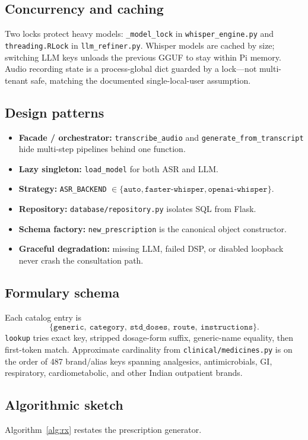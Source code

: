 \documentclass[11pt,a4paper]{article}
\begin{document}
\subsection{Concurrency and caching}
Two locks protect heavy models: \texttt{\_model\_lock} in \texttt{whisper\_engine.py} and \texttt{threading.RLock} in \texttt{llm\_refiner.py}. Whisper models are cached by size; switching LLM keys unloads the previous GGUF to stay within Pi memory. Audio recording state is a process-global dict guarded by a lock---not multi-tenant safe, matching the documented single-local-user assumption.

\subsection{Design patterns}
\begin{itemize}[leftmargin=1.4em]
  \item \textbf{Facade / orchestrator:} \texttt{transcribe\_audio} and \texttt{generate\_from\_transcript} hide multi-step pipelines behind one function.
  \item \textbf{Lazy singleton:} \texttt{load\_model} for both ASR and LLM.
  \item \textbf{Strategy:} \texttt{ASR\_BACKEND} $\in\{\texttt{auto},\texttt{faster-whisper},\texttt{openai-whisper}\}$.
  \item \textbf{Repository:} \texttt{database/repository.py} isolates SQL from Flask.
  \item \textbf{Schema factory:} \texttt{new\_prescription} is the canonical object constructor.
  \item \textbf{Graceful degradation:} missing LLM, failed DSP, or disabled loopback never crash the consultation path.
\end{itemize}

\subsection{Formulary schema}
Each catalog entry is
\[
  \{\texttt{generic},\ \texttt{category},\ \texttt{std\_doses},\ \texttt{route},\ \texttt{instructions}\}.
\]
\texttt{lookup} tries exact key, stripped dosage-form suffix, generic-name equality, then first-token match. Approximate cardinality from \texttt{clinical/medicines.py} is on the order of 487 brand/alias keys spanning analgesics, antimicrobials, GI, respiratory, cardiometabolic, and other Indian outpatient brands.

\subsection{Algorithmic sketch}
Algorithm~\ref{alg:rx} restates the prescription generator.
\end{document}
